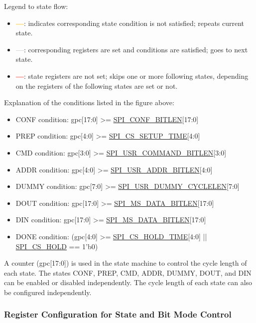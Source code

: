 \documentclass[main\_\_EN.tex]{subfiles}
\begin{document}
Legend to state flow:
\begin{itemize}
    \item \textcolor{orange}{\textbf{—}}:
indicates corresponding state condition is not satisfied; repeats current state.
    \item \textcolor{cyan}{\textbf{—}}: corresponding registers are set and conditions are satisfied; goes to next state.
    \item \textcolor{red}{\textbf{—}}: state registers are not set; skips one or more following states, depending on the registers of the following states are set or not.
\end{itemize}

Explanation of the conditions listed in the figure above:
\begin{itemize}
    \item CONF condition: gpc[17:0] >= \hyperref[fielddesc:SPICONFBITLEN]{SPI\_CONF\_BITLEN}[17:0]
    \item PREP condition: gpc[4:0] >= \hyperref[fielddesc:SPICSSETUPTIME]{SPI\_CS\_SETUP\_TIME}[4:0]
    \item CMD condition: gpc[3:0] >= \hyperref[fielddesc:SPIUSRCOMMANDBITLEN]{SPI\_USR\_COMMAND\_BITLEN}[3:0]
    \item ADDR condition: gpc[4:0] >= \hyperref[fielddesc:SPIUSRADDRBITLEN]{SPI\_USR\_ADDR\_BITLEN}[4:0]
    \item DUMMY condition: gpc[7:0] >= \hyperref[fielddesc:SPIUSRDUMMYCYCLELEN]{SPI\_USR\_DUMMY\_CYCLELEN}[7:0]
    \item DOUT condition: gpc[17:0] >= \hyperref[fielddesc:SPIMSDATABITLEN]{SPI\_MS\_DATA\_BITLEN}[17:0]
    \item DIN condition: gpc[17:0] >= \hyperref[fielddesc:SPIMSDATABITLEN]{SPI\_MS\_DATA\_BITLEN}[17:0]

    \item DONE condition: (gpc[4:0] >= \hyperref[fielddesc:SPICSHOLDTIME]{SPI\_CS\_HOLD\_TIME}[4:0] || \hyperref[fielddesc:SPICSHOLD]{SPI\_CS\_HOLD} == 1'b0)

\end{itemize}





A counter (gpc[17:0]) is used in the state machine to control the cycle length of each state. The states CONF, PREP, CMD, ADDR, DUMMY, DOUT, and DIN can be enabled or disabled independently. The cycle length of each state can also be configured independently.

\subsubsection{Register Configuration for State and Bit Mode Control} \label{sec:gp-spi2-state-and-register-configuration}
\end{document}
